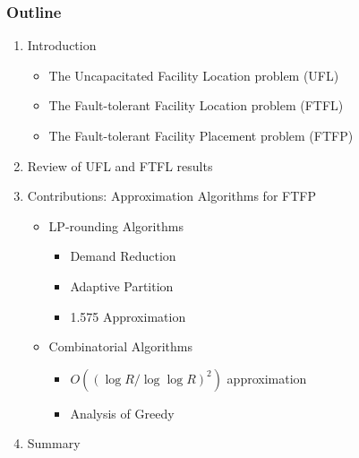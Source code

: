 \documentclass[handout, hyperref, xcolor=dvipsnames]{beamer}
\begin{document}
\begin{frame}
  \frametitle{Outline}
  \begin{enumerate}
  \item Introduction
    \begin{itemize}
    \item The Uncapacitated Facility Location problem (UFL)
    \item The Fault-tolerant Facility Location problem (FTFL)
    \item The Fault-tolerant Facility Placement problem (FTFP)
    \end{itemize}
  \item Review of UFL and FTFL results
  \item Contributions: Approximation Algorithms for FTFP
      \begin{itemize}
      \item LP-rounding Algorithms
        \begin{itemize}
        \item Demand Reduction
        \item Adaptive Partition
        \item 1.575 Approximation
        \end{itemize}
      \item Combinatorial Algorithms
        \begin{itemize}
        \item $O((\log R / \log\log R)^2)$ approximation
        \item Analysis of Greedy
        \end{itemize}
      \end{itemize}
  \item{Summary}
  \end{enumerate}
\end{frame}
\end{document}
